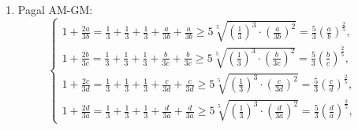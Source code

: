 \begin{enumerate}
$$\begin{array}{ll}
\frac{a}{b}+\frac{a}{b}+\frac{b}{c}\geq3\sqrt[3]{\frac{a}{b}\cdot\frac{a}{b}\cdot\frac{b}{c}}=\frac{3a}{\sqrt[3]{abc}},&\\
\frac{b}{c}+\frac{b}{c}+\frac{c}{a}\geq3\sqrt[3]{\frac{b}{c}\cdot\frac{b}{c}\cdot\frac{c}{a}}=\frac{3b}{\sqrt[3]{abc}},&\\
\frac{c}{a}+\frac{c}{a}+\frac{a}{b}\geq3\sqrt[3]{\frac{c}{a}\cdot\frac{c}{a}\cdot\frac{a}{b}}=\frac{3c}{\sqrt[3]{abc}},&
\end{array}\right.$$ \begin{equation*}
\Rightarrow\frac{a}{b}+\frac{b}{c}+\frac{c}{a}\geq\frac{a+b+c}{\sqrt[3]{abc}}.\tag{1}\end{equation*}
Taip pat: $$+\left\{\begin{array}{ll}
\frac{b}{a}+\frac{b}{a}+\frac{a}{c}\geq3\sqrt[3]{\frac{b}{a}\cdot\frac{b}{a}\cdot\frac{a}{c}}=\frac{3b}{\sqrt[3]{abc}},&\\
\frac{c}{b}+\frac{c}{b}+\frac{b}{a}\geq3\sqrt[3]{\frac{c}{b}\cdot\frac{c}{b}\cdot\frac{b}{a}}=\frac{3c}{\sqrt[3]{abc}},&\\
\frac{a}{c}+\frac{a}{c}+\frac{c}{b}\geq3\sqrt[3]{\frac{a}{c}\cdot\frac{a}{c}\cdot\frac{c}{b}}=\frac{3a}{\sqrt[3]{abc}},&
\end{array}\right.$$ \begin{equation*}
\Rightarrow\frac{b}{a}+\frac{c}{b}+\frac{a}{c}\geq\frac{a+b+c}{\sqrt[3]{abc}}.\tag{2}\end{equation*}
Sudėję (1) ir (2) gausime tai, ką reikėjo įrodyti.
\item 
Pagal AM-GM: $$\left\{\begin{array}{ll}
1+\frac{2a}{3b}=\frac{1}{3}+\frac{1}{3}+\frac{1}{3}+\frac{a}{3b}+\frac{a}{3b}\geq5\sqrt[5]{\left(\frac{1}{3}\right)^3\cdot\left(\frac{a}{3b}\right)^2}=\frac{5}{3}\left(\frac{a}{b}\right)^{\frac{2}{5}},&\\
1+\frac{2b}{3c}=\frac{1}{3}+\frac{1}{3}+\frac{1}{3}+\frac{b}{3c}+\frac{b}{3c}\geq5\sqrt[5]{\left(\frac{1}{3}\right)^3\cdot\left(\frac{b}{3c}\right)^2}=\frac{5}{3}\left(\frac{b}{c}\right)^{\frac{2}{5}},&\\
1+\frac{2c}{3d}=\frac{1}{3}+\frac{1}{3}+\frac{1}{3}+\frac{c}{3d}+\frac{c}{3d}\geq5\sqrt[5]{\left(\frac{1}{3}\right)^3\cdot\left(\frac{c}{3d}\right)^2}=\frac{5}{3}\left(\frac{c}{d}\right)^{\frac{2}{5}},&\\
1+\frac{2d}{3a}=\frac{1}{3}+\frac{1}{3}+\frac{1}{3}+\frac{d}{3a}+\frac{d}{3a}\geq5\sqrt[5]{\left(\frac{1}{3}\right)^3\cdot\left(\frac{d}{3a}\right)^2}=\frac{5}{3}\left(\frac{d}{a}\right)^{\frac{2}{5}},&

\end{array}$$
\end{enumerate}
